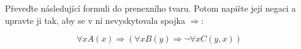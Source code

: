 Převeďte následující formuli do prenexního tvaru. Potom napište její negaci a
upravte ji tak, aby se v ní nevyskytovala spojka $\Rightarrow$:

$$\forall x A(x) \Rightarrow (\forall x B(y) \Rightarrow \neg \forall x
C(y,x))$$
